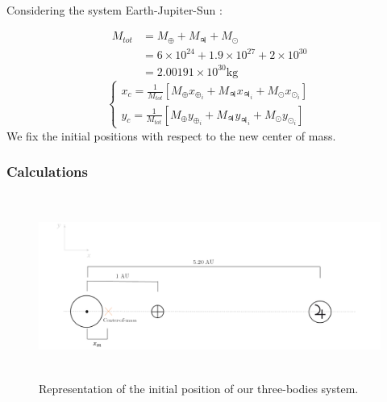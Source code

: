 \documentclass[a4paper, twoside, 11pt]{report}
\theoremstyle{theorem}
\theoremstyle{remark}
\theoremstyle{exemple}
\begin{document}
            \paragraph{}Considering the system Earth-Jupiter-Sun :
            
                \begin{align*}
                    M_{tot} &= M_{\oplus} + M_{\jupiter} + M_{\odot} \\
                    &= 6\times10^{24} + 1.9\times 10^{27} + 2 \times 10^{30}\\
                    &= 2.00191 \times 10^{30} \mathrm{kg}
                \end{align*}
                \begin{equation*}
                    \left\{
                        \begin{aligned}
                            x_c = \frac{1}{M_{tot}} [M_{\oplus} x_{\oplus_i} + M_{\jupiter} x_{\jupiter_i} + M_{\odot} x_{\odot_i}] \\
                            y_c = \frac{1}{M_{tot}} [M_{\oplus} y_{\oplus_i} + M_{\jupiter} y_{\jupiter_i} + M_{\odot} y_{\odot_i}]
                        \end{aligned}
                    \right.
                \end{equation*} 
            We fix the initial positions with respect to the new center of mass.
            
            \subsubsection{Calculations}
            
                \begin{center}
                \begin{figure}[h!]
                    \includegraphics[width=16cm,height=6cm]{dessinplanete.png}
                    \caption{Representation of the initial position of our three-bodies system.}
                \end{figure}
                \end{center}
                
\end{document}

